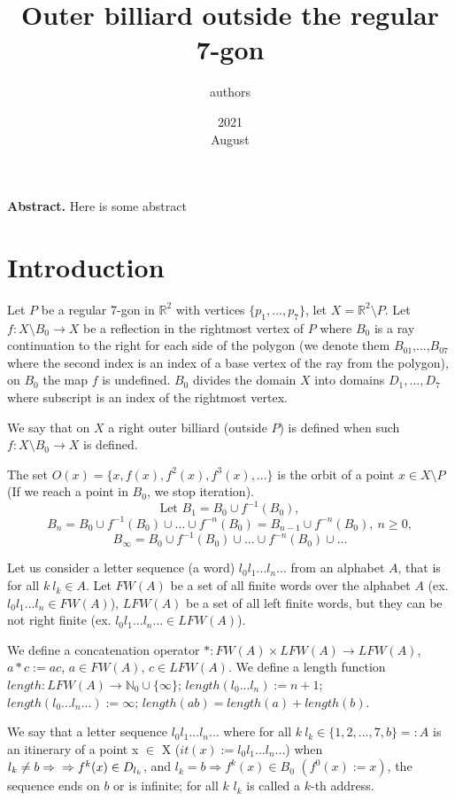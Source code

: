 \documentclass[a4paper, 12pt]{article}
\title{Outer billiard outside the regular 7-gon}
\date{2021\\ August}
\author{authors}
\begin{document}
\maketitle
\textbf{Abstract.} Here is some abstract
\section{Introduction}
Let $P$ be a regular 7-gon in $\mathbb{R}^2$ with vertices $\{p_1,...,p_7\}$, let $X=\mathbb{R}^2\setminus P$. Let $f:X\setminus B_0 \rightarrow X$ be a reflection in the rightmost vertex of $P$ where $B_0$ is a ray continuation to the right for each side of the polygon (we denote them $B_{01}$,...,$B_{07}$ where the second index is an index of a base vertex of the ray from the polygon), on $B_0$ the map $f$ is undefined. $B_0$ divides the domain $X$ into domains $D_1,...,D_7$ where subscript is an index of the rightmost vertex.

We say that on $X$ a right outer billiard (outside $P$) is defined when such $f:X\setminus B_0 \rightarrow X$ is defined.

The set $O(x)=\{x,f(x),f^2(x),f^3(x),...\}$ is the orbit of a point $x\in X \setminus P$(If we reach a point in $B_0$, we stop iteration).
\[\text{Let } B_1=B_0 \cup f^{-1}(B_0),\]
\[B_n=B_0\cup f^{-1}(B_0)\cup...\cup f^{-n}(B_0)=B_{n-1}\cup f^{-n}(B_0),\ n \geq 0,\]
\[B_{\infty}=B_0\cup f^{-1}(B_0)\cup...\cup f^{-n}(B_0)\cup...\]

Let us consider a letter sequence (a word) $l_0l_1...l_n...$ from an alphabet $A$, that is for all $ k\ l_k\in A$. Let $FW(A)$ be a set of all finite words over the alphabet $A$ (ex. $l_0l_1...l_n\in FW(A)$), $LFW(A)$ be a set of all left finite words, but they can be not right finite (ex. $l_0l_1...l_n...\in LFW(A)$).

We define a concatenation operator $\ast :FW(A)\times LFW(A)\rightarrow LFW(A)$,\newline
$a\ast c := ac$, $a\in FW(A)$, $c \in LFW(A)$.\newpage
We define a length function $length:LFW(A)\rightarrow \mathbb{N}_0\cup\{\infty\}$; $length(l_0...l_n):=n+1$; $length(l_0...l_n...):=\infty$; $length(ab)=length(a)+length(b)$.

We say that a letter sequence $l_0l_1...l_n...$ where for all $k\ l_k\in \{1,2,...,7,b\}=:A$ is an itinerary of a point x $\in$ X ($it(x):=l_0l_1...l_n...$) when $l_k\neq b \Rightarrow\newline\Rightarrow f^k(x)\in D_{l_k}$, and $l_k = b \Rightarrow f^k(x)\in B_0$ $(f^0(x):=x)$, the sequence ends on $b$ or is infinite; for all $k$ $l_k$ is called a $k$-th address.
\end{document}

